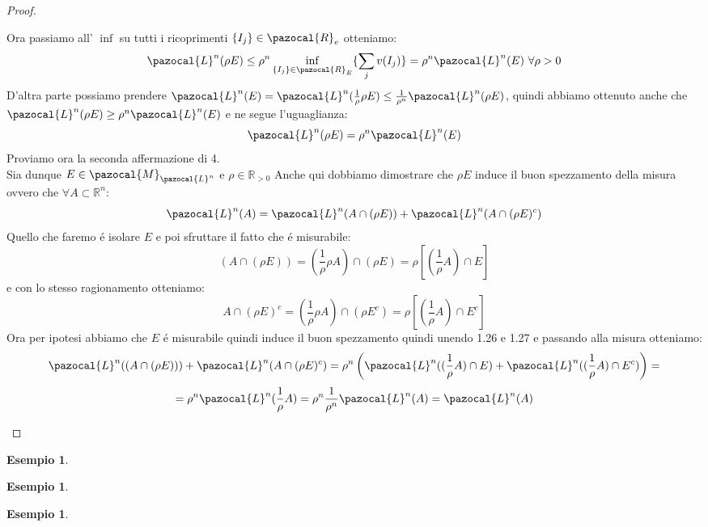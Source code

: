 \documentclass[11pt,a4paper]{report}
\theoremstyle{plain}
\theoremstyle{definition}
\newtheorem{exmp}[thm]{Esempio} %
\newcommand{\Le}{\pazocal{L}}
\newcommand{\Ml}{\pazocal{M}_{\Le^n}}
\begin{document}
\begin{proof}
\begin{enumerate}
\[		\]
		Ora passiamo all' $\inf$ su tutti i ricoprimenti $\{I_j\}\in \pazocal{R}_e$ otteniamo:
		\[
			\Le^n(\rho E) \le \rho^n \inf\limits_{\{I_j\} \in \pazocal{R}_E}\{\sum\limits_j v(I_j)\} = \rho^n \Le^n(E)\ \forall \rho > 0
		\]
		D'altra parte possiamo prendere $\Le^n(E) = \Le^n(\frac{1}{\rho}\rho E) \le \frac{1}{\rho^n}\Le^n(\rho E)$, quindi abbiamo ottenuto anche che $\Le^n(\rho E) \ge \rho^n \Le^n(E)$ e ne segue l'uguaglianza:
		\[
			\Le^n(\rho E) = \rho^n \Le^n(E)
		\]
		Proviamo ora la seconda affermazione di 4.\\
		Sia dunque $E \in \Ml$ e $\rho \in \mathbb{R}_{>0}$ Anche qui dobbiamo dimostrare che $\rho E$ induce il buon spezzamento della misura ovvero che $\forall A \subset \mathbb{R}^n$:
		\[
			\Le^n(A) = \Le^n(A \cap (\rho E)) + \Le^n(A \cap (\rho E)^c)
		\]
		Quello che faremo \'e isolare $E$ e poi sfruttare il fatto che \'e misurabile:
			\begin{equation}
				(A \cap (\rho E)) = (\frac{1}{\rho} \rho A) \cap (\rho E) = \rho \left[(\frac{1}{\rho} A)\cap E\right]
				\end{equation}
				e con lo stesso ragionamento otteniamo:
				\begin{equation}
				A \cap (\rho E)^c = (\frac{1}{\rho} \rho A) \cap (\rho E^c) = \rho \left[(\frac{1}{\rho} A)\cap E^c\right]
				\end{equation}
				Ora per ipotesi abbiamo che $E$ \'e misurabile quindi induce il buon spezzamento quindi unendo 1.26 e 1.27 e passando alla misura otteniamo:
				\[
					\Le^n((A \cap (\rho E)))	 + \Le^n(A \cap (\rho E)^c) = \rho^n \left( \Le^n((\frac{1}{\rho} A)\cap E) + \Le^n((\frac{1}{\rho} A)\cap E^c) \right) = 
				\]
			\[
				= \rho^n \Le^n(\frac{1}{\rho} A) = \rho^n \frac{1}{\rho^n} \Le^n(A) = \Le^n(A)			
			\]	
	\end{enumerate}
\end{proof}
\begin{exmp}
\end{exmp}

\begin{exmp}
\end{exmp}

\begin{exmp}
\end{exmp}
\end{document}
